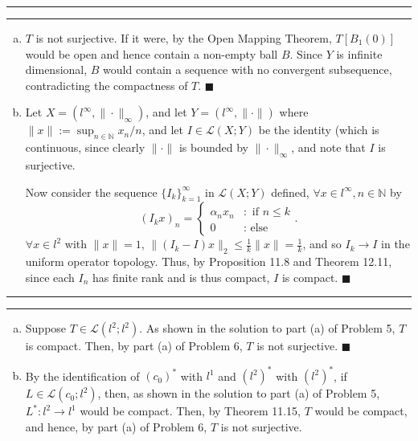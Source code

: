\documentclass[11pt]{article}
\newcounter{questionCounter}
\newcounter{partCounter}[questionCounter]
\newenvironment{question}[2][\arabic{questionCounter}]{%
    \setcounter{partCounter}{0}%
    \vspace{.25in} \hrule \vspace{0.5em}%
        \noindent{\bf #2}%
    \vspace{0.8em} \hrule \vspace{.10in}%
    \addtocounter{questionCounter}{1}%
}{}
\renewcommand{\qed}{\quad $\blacksquare$}
\newcommand{\N}{\mathbb{N}} %
\renewcommand{\L}{\mathcal{L}} %
\begin{document}
\begin{question}{Problem 6}
\vspace{-0.2in}
\begin{enumerate}[(a)]
\item $T$ is not surjective. If it were, by the Open Mapping Theorem,
$T[B_1(0)]$ would be open and hence contain a non-empty ball $B$. Since $Y$ is
infinite dimensional, $B$ would contain a sequence with no convergent
subsequence, contradicting the compactness of $T$. \qed

\item Let $X = (l^{\infty}, \|\cdot\|_\infty)$, and let
$Y = (l^\infty,\|\cdot\|)$ where $\|x\| := \sup_{n \in \N} x_n/n$, and let
$I \in \L(X;Y)$ be the identity (which is continuous, since clearly $\|\cdot\|$
is bounded by $\|\cdot\|_\infty$, and note that $I$ is surjective.

Now consider the sequence $\{I_k\}_{k = 1}^\infty$ in $\L(X;Y)$ defined,
$\forall x \in l^\infty, n \in \N$ by
\[(I_kx)_n
    = \left\{
        \begin{array}{cl}
            \alpha_nx_n &   : \mbox{ if } n \leq k    \\
            0           &   : \mbox{ else }
        \end{array}
    \right..
\]
$\forall x \in l^2$ with $\|x\| = 1$,
$\|(I_k - I)x\|_2 \leq \frac1k\|x\| = \frac1k$,
and so $I_k \to I$ in the uniform operator topology. Thus, by Proposition 11.8
and Theorem 12.11, since each $I_n$ has finite rank and is thus compact, $I$ is
compact. \qed
\end{enumerate}
\vspace{-0.2in}
\end{question}

\begin{question}{Problem 7}
\vspace{-0.15in}
\begin{enumerate}[(a)]
\item Suppose $T \in \L(l^2;l^2)$. As shown in the solution to part (a) of
Problem 5, $T$ is compact. Then, by part (a) of Problem 6, $T$ is not
surjective. \qed

\item By the identification of $(c_0)^*$ with $l^1$ and $(l^2)^*$ with
$(l^2)^*$, if $L \in \L(c_0;l^2)$, then, as shown in the solution to part (a)
of Problem 5, $L^* : l^2 \to l^1$ would be compact. Then, by Theorem 11.15,
$T$ would be compact, and hence, by part (a) of Problem 6, $T$ is not
surjective.
\end{enumerate}
\vspace{-0.2in}
\end{question}
\end{document}
